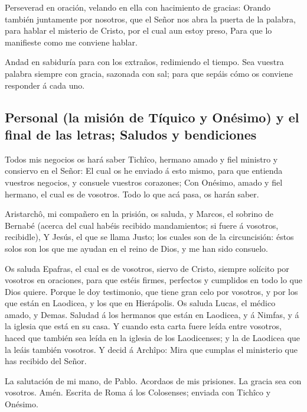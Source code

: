  Perseverad en oración, velando en ella con hacimiento de
gracias:  Orando también juntamente por nosotros, que el
Señor nos abra la puerta de la palabra, para hablar el misterio de
Cristo, por el cual aun estoy preso,  Para que lo manifieste
como me conviene hablar.

 Andad en sabiduría para con los extraños, redimiendo el
tiempo.  Sea vuestra palabra siempre con gracia, sazonada
con sal; para que sepáis cómo os conviene responder á cada uno.

\hypertarget{personal-la-misiuxf3n-de-tuxedquico-y-onuxe9simo-y-el-final-de-las-letras-saludos-y-bendiciones}{%
\subsection{Personal (la misión de Tíquico y Onésimo) y el final de las
letras; Saludos y
bendiciones}\label{personal-la-misiuxf3n-de-tuxedquico-y-onuxe9simo-y-el-final-de-las-letras-saludos-y-bendiciones}}

 Todos mis negocios os hará saber Tichîco, hermano amado y
fiel ministro y consiervo en el Señor:  El cual os he
enviado á esto mismo, para que entienda vuestros negocios, y consuele
vuestros corazones;  Con Onésimo, amado y fiel hermano, el
cual es de vosotros. Todo lo que acá pasa, os harán saber.

 Aristarchô, mi compañero en la prisión, os saluda, y
Marcos, el sobrino de Bernabé (acerca del cual habéis recibido
mandamientos; si fuere á vosotros, recibidle),  Y Jesús, el
que se llama Justo; los cuales son de la circuncisión: éstos solos son
los que me ayudan en el reino de Dios, y me han sido consuelo.

 Os saluda Epafras, el cual es de vosotros, siervo de
Cristo, siempre solícito por vosotros en oraciones, para que estéis
firmes, perfectos y cumplidos en todo lo que Dios quiere. 
Porque le doy testimonio, que tiene gran celo por vosotros, y por los
que están en Laodicea, y los que en Hierápolis.  Os saluda
Lucas, el médico amado, y Demas.  Saludad á los hermanos
que están en Laodicea, y á Nimfas, y á la iglesia que está en su casa.
 Y cuando esta carta fuere leída entre vosotros, haced que
también sea leída en la iglesia de los Laodicenses; y la de Laodicea que
la leáis también vosotros.  Y decid á Archîpo: Mira que
cumplas el ministerio que has recibido del Señor.

 La salutación de mi mano, de Pablo. Acordaos de mis
prisiones. La gracia sea con vosotros. Amén. Escrita de Roma á los
Colosenses; enviada con Tichîco y Onésimo.
